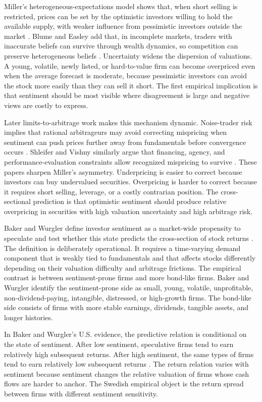 \documentclass[11pt]{article}
\begin{document}
Miller's heterogeneous-expectations model shows that, when short selling is restricted, prices can be set by the optimistic investors willing to hold the available supply, with weaker influence from pessimistic investors outside the market \citep{miller1977divergence}. Blume and Easley add that, in incomplete markets, traders with inaccurate beliefs can survive through wealth dynamics, so competition can preserve heterogeneous beliefs \citep{blume2006smart}. Uncertainty widens the dispersion of valuations. A young, volatile, newly listed, or hard-to-value firm can become overpriced even when the average forecast is moderate, because pessimistic investors can avoid the stock more easily than they can sell it short. The first empirical implication is that sentiment should be most visible where disagreement is large and negative views are costly to express.

Later limits-to-arbitrage work makes this mechanism dynamic. Noise-trader risk implies that rational arbitrageurs may avoid correcting mispricing when sentiment can push prices further away from fundamentals before convergence occurs \citep{delong1990noise}. Shleifer and Vishny similarly argue that financing, agency, and performance-evaluation constraints allow recognized mispricing to survive \citep{shleifer1997limits}. These papers sharpen Miller's asymmetry. Underpricing is easier to correct because investors can buy undervalued securities. Overpricing is harder to correct because it requires short selling, leverage, or a costly contrarian position. The cross-sectional prediction is that optimistic sentiment should produce relative overpricing in securities with high valuation uncertainty and high arbitrage risk.

Baker and Wurgler define investor sentiment as a market-wide propensity to speculate and test whether this state predicts the cross-section of stock returns \citep{baker2006sentiment,baker2007}. The definition is deliberately operational. It requires a time-varying demand component that is weakly tied to fundamentals and that affects stocks differently depending on their valuation difficulty and arbitrage frictions. The empirical contrast is between sentiment-prone firms and more bond-like firms. Baker and Wurgler identify the sentiment-prone side as small, young, volatile, unprofitable, non-dividend-paying, intangible, distressed, or high-growth firms. The bond-like side consists of firms with more stable earnings, dividends, tangible assets, and longer histories.

In Baker and Wurgler's U.S. evidence, the predictive relation is conditional on the state of sentiment. After low sentiment, speculative firms tend to earn relatively high subsequent returns. After high sentiment, the same types of firms tend to earn relatively low subsequent returns \citep{baker2006sentiment}. The return relation varies with sentiment because sentiment changes the relative valuation of firms whose cash flows are harder to anchor. The Swedish empirical object is the return spread between firms with different sentiment sensitivity.
\end{document}
